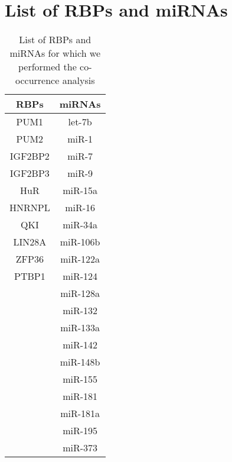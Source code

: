 \chapter{List of RBPs and miRNAs}
\label{chp:appendixA}

\begin{table}[H]
\centering
\caption{List of RBPs and miRNAs for which we performed the co-occurrence analysis}
\begin{tabular}{| c | c |}
\hline
RBPs & miRNAs \\ [0.5ex]
\hline\hline
PUM1 & let-7b \\
PUM2 & miR-1 \\
IGF2BP2 & miR-7 \\
IGF2BP3 & miR-9 \\
HuR & miR-15a \\
HNRNPL & miR-16 \\
QKI & miR-34a \\
LIN28A &  miR-106b \\
ZFP36 & miR-122a \\
PTBP1 & miR-124 \\
 & miR-128a \\
 & miR-132 \\
 & miR-133a \\
 & miR-142 \\
 & miR-148b \\
 & miR-155 \\
 & miR-181 \\
 & miR-181a \\
 & miR-195 \\
 & miR-373 \\
\hline
\end{tabular}
\label{tbl:list_rbp_mirna}
\end{table}